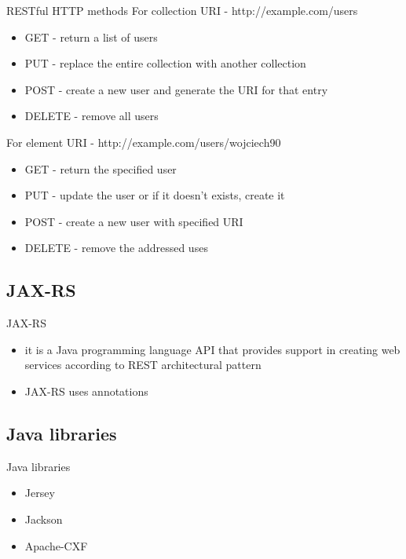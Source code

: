 	\begin{frame}{RESTful HTTP methods}	
		For collection URI - http://example.com/users
		\begin{itemize}
		  \item GET - return a list of users
		  \item PUT - replace the entire collection with another collection
		  \item POST - create a new user and generate the URI for that entry
		  \item DELETE - remove all users
		\end{itemize}
		
		\vspace{1cm}
		
		For element URI - http://example.com/users/wojciech90
		\begin{itemize}
		  \item GET - return the specified user
		  \item PUT - update the user or if it doesn't exists, create it
		  \item POST - create a new user with specified URI
		  \item DELETE - remove the addressed uses
		\end{itemize}
	\end{frame}	
	

  
\subsection{JAX-RS}
	\begin{frame}{JAX-RS}
    	\begin{itemize}
			\item it is a Java programming language API that provides support in creating web services according to REST architectural pattern
			\item JAX-RS uses annotations
		\end{itemize}
	\end{frame}
	
\subsection{Java libraries}
	\begin{frame}{Java libraries}
		\begin{itemize}
			\item Jersey
			\item Jackson
			\item Apache-CXF
		\end{itemize}
	\end{frame}
	
	
